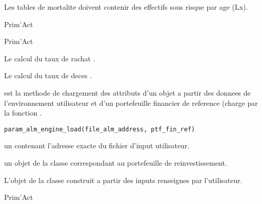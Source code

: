 \documentclass[a4paper]{book}
\begin{document}
%
\begin{Note}\relax
Les tables de mortalite doivent contenir des effectifs sous risque par age (Lx).
\end{Note}
%
\begin{Author}\relax
Prim'Act

Prim'Act
\end{Author}
%
\begin{SeeAlso}\relax
Le calcul du taux de rachat .

Le calcul du taux de deces .
\end{SeeAlso}
%
\begin{Description}\relax
{} est la methode de chargement des attributs d'un objet 
a partir des donnees de l'environnement utilisateur et d'un portefeuille financier de reference (charge par la fonction .
\end{Description}
%
\begin{Usage}
\begin{verbatim}
param_alm_engine_load(file_alm_address, ptf_fin_ref)
\end{verbatim}
\end{Usage}
%
\begin{Arguments}
\begin{ldescription}
\item[\code{file\_alm\_address}] un  contenant l'adresse exacte
du fichier d'input utilisateur.

\item[\code{ptf\_fin\_ref}] un objet de la classe  correspondant au portefeuille de reinvestissement.
\end{ldescription}
\end{Arguments}
%
\begin{Value}
L'objet de la classe  construit a partir des inputs renseignes par l'utilisateur.
\end{Value}
%
\begin{Author}\relax
Prim'Act
\end{Author}
\end{document}

